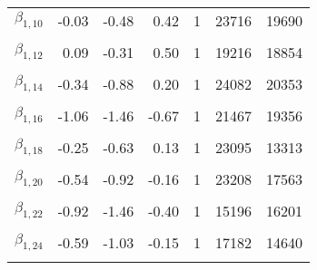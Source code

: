 \begin{table}
\begin{tabular}[t]{lrrrrrr}
$\beta_{1, 10}$ & -0.03 & -0.48 & 0.42 & 1 & 23716 & 19690\\
\cellcolor{gray!6}{$\beta_{1, 11}$} & \cellcolor{gray!6}{-0.83} & \cellcolor{gray!6}{-1.34} & \cellcolor{gray!6}{-0.32} & \cellcolor{gray!6}{1} & \cellcolor{gray!6}{16561} & \cellcolor{gray!6}{15831}\\
$\beta_{1, 12}$ & 0.09 & -0.31 & 0.50 & 1 & 19216 & 18854\\
\cellcolor{gray!6}{$\beta_{1, 13}$} & \cellcolor{gray!6}{-0.11} & \cellcolor{gray!6}{-0.51} & \cellcolor{gray!6}{0.29} & \cellcolor{gray!6}{1} & \cellcolor{gray!6}{22156} & \cellcolor{gray!6}{16591}\\
$\beta_{1, 14}$ & -0.34 & -0.88 & 0.20 & 1 & 24082 & 20353\\
\cellcolor{gray!6}{$\beta_{1, 15}$} & \cellcolor{gray!6}{-0.23} & \cellcolor{gray!6}{-0.61} & \cellcolor{gray!6}{0.15} & \cellcolor{gray!6}{1} & \cellcolor{gray!6}{25221} & \cellcolor{gray!6}{20077}\\
$\beta_{1, 16}$ & -1.06 & -1.46 & -0.67 & 1 & 21467 & 19356\\
\cellcolor{gray!6}{$\beta_{1, 17}$} & \cellcolor{gray!6}{-0.89} & \cellcolor{gray!6}{-1.26} & \cellcolor{gray!6}{-0.53} & \cellcolor{gray!6}{1} & \cellcolor{gray!6}{17498} & \cellcolor{gray!6}{15873}\\
$\beta_{1, 18}$ & -0.25 & -0.63 & 0.13 & 1 & 23095 & 13313\\
\cellcolor{gray!6}{$\beta_{1, 19}$} & \cellcolor{gray!6}{-0.32} & \cellcolor{gray!6}{-0.71} & \cellcolor{gray!6}{0.07} & \cellcolor{gray!6}{1} & \cellcolor{gray!6}{23997} & \cellcolor{gray!6}{17733}\\
$\beta_{1, 20}$ & -0.54 & -0.92 & -0.16 & 1 & 23208 & 17563\\
\cellcolor{gray!6}{$\beta_{1, 21}$} & \cellcolor{gray!6}{-0.41} & \cellcolor{gray!6}{-0.86} & \cellcolor{gray!6}{0.05} & \cellcolor{gray!6}{1} & \cellcolor{gray!6}{10217} & \cellcolor{gray!6}{13204}\\
$\beta_{1, 22}$ & -0.92 & -1.46 & -0.40 & 1 & 15196 & 16201\\
\cellcolor{gray!6}{$\beta_{1, 23}$} & \cellcolor{gray!6}{-0.69} & \cellcolor{gray!6}{-1.06} & \cellcolor{gray!6}{-0.31} & \cellcolor{gray!6}{1} & \cellcolor{gray!6}{21661} & \cellcolor{gray!6}{18406}\\
$\beta_{1, 24}$ & -0.59 & -1.03 & -0.15 & 1 & 17182 & 14640\\
\cellcolor{gray!6}{$\beta_{1, 25}$} & \cellcolor{gray!6}{-0.85} & \cellcolor{gray!6}{-1.39} & \cellcolor{gray!6}{-0.34} & \cellcolor{gray!6}{1} & \cellcolor{gray!6}{22678} & \cellcolor{gray!6}{20135}\\

\end{tabular}
\end{table}
